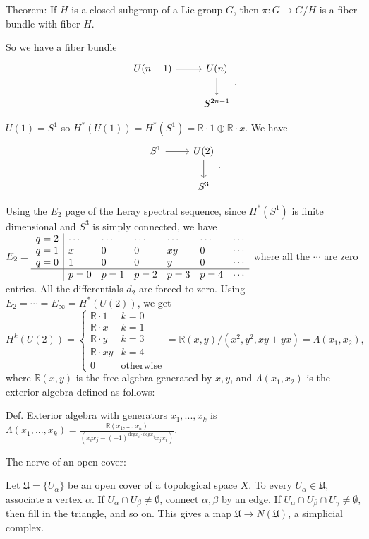 \documentclass{article}
\theoremstyle{mystyle}
\theoremstyle{remark}
\numberwithin{equation}{section}
\begin{document}
Theorem: If $H$ is a closed subgroup of a Lie group $G$, then $\pi\colon G\rightarrow G/H$ is a fiber bundle with fiber $H$.

So we have a fiber bundle 
$$\begin{tikzcd} U(n-1)\ar[r]& U(n)\ar[d] \\&S^{2n-1}\end{tikzcd}.$$

$U(1)=S^1$ so $H^*(U(1)) = H^*(S^1) = \mathbb{R}\cdot 1\oplus \mathbb{R}\cdot x$. We have 
$$\begin{tikzcd} S^1\ar[r]& U(2)\ar[d] \\&S^3\end{tikzcd}.$$

Using the $E_2$ page of the Leray spectral sequence, since $H^*(S^1)$ is finite dimensional and $S^3$ is simply connected, we have
$E_2 = \begin{array}{l|llllll} q=2 & \cdots & \cdots & \cdots & \cdots & \cdots &\cdots \\
q=1 & x & 0 & 0 & x y & 0 &\cdots \\
q=0 & 1 & 0 & 0 & y & 0  &\cdots\\
\hline
& p=0 & p=1 & p=2 & p=3 & p=4  & \cdots  \end{array}$ where all the $\cdots$ are zero entries. All the differentials $d_2$ are forced to zero. Using $E_2=\cdots = E_\infty = H^*(U(2))$,  we get 
$$H^k(U(2)) = \left\{\begin{array}{ll} \mathbb{R}\cdot 1 & k=0\\\mathbb{R}\cdot x & k=1 \\
\mathbb{R}\cdot y & k=3\\ 
\mathbb{R}\cdot xy & k=4 \\
0 & \text{otherwise}\end{array}\right.
= \mathbb{R}(x,y)/(x^2,y^2,xy+yx) = \Lambda(x_1,x_2),$$
where $\mathbb{R}(x,y)$ is the free algebra generated by $x,y$, and $\Lambda(x_1,x_2)$ is the exterior algebra defined as follows: 

Def. Exterior algebra with generators $x_1,...,x_k$ is $\Lambda (x_1,...,x_k) = \frac{\mathbb{R}(x_1,...,x_k)}{(x_ix_j -(-1)^{\text{deg}x_i\cdot \text{deg}x_j} x_jx_i)}$.

The nerve of an open cover:

Let $\mathfrak{U} = \{U_\alpha\}$ be an open cover of a topological space $X$. To every $U_\alpha \in \mathfrak{U}$, associate a vertex $\alpha$. If $U_\alpha \cap U_\beta \neq \emptyset$, connect $\alpha,\beta$ by an edge. If $U_\alpha \cap U_\beta \cap U_\gamma \neq \emptyset$, then fill in the triangle, and so on. This gives a map $\mathfrak{U}\rightarrow N(\mathfrak{U})$, a simplicial complex.
\end{document}

